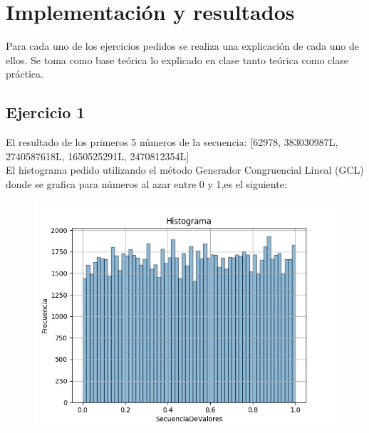 \documentclass[11pt,a4paper]{article}
\begin{document}
\section{Implementación y resultados}
Para cada uno de los ejercicios pedidos se realiza una explicación de cada uno de ellos. Se toma como base teórica lo explicado en clase tanto teórica como clase práctica.

	\subsection{Ejercicio 1}
		El resultado de los primeros 5 números de la secuencia: [62978, 383030987L, 2740587618L, 1650525291L, 2470812354L]\\
		El histograma pedido utilizando el método Generador Congruencial Lineal (GCL) donde se grafica para números al azar entre 0 y 1,es el siguiente:
		\begin{figure}[H]
  			\centering
    			\includegraphics[width=14cm]{imagenes/histogramaEjer1}
		\end{figure}
\end{document}
